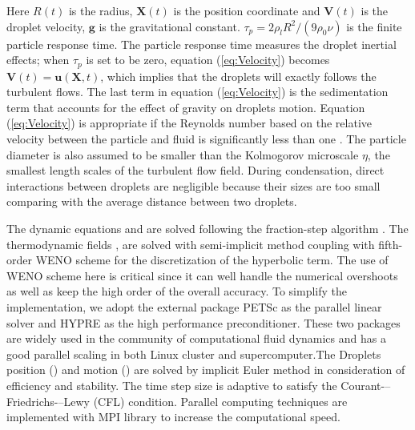 Here $R(t)$ is the radius, $\mathbf{X}(t)$ is the position coordinate and
$\mathbf{V}(t)$ is the droplet velocity, $\mathbf{g}$ is the gravitational
constant. $\tau_{p}=2\rho_{l}R^{2}/(9\rho_{0}\nu)$ is the finite particle
response time. The particle response time measures the droplet inertial
effects; when $\tau_{p}$ is set to be zero, equation (\ref{eq:Velocity})
becomes $\mathbf{V}(t)=\mathbf{u}(\mathbf{X},t)$, which implies that the
droplets will exactly follows the turbulent flows. The last term in equation
(\ref{eq:Velocity}) is the sedimentation term that accounts for the effect of
gravity on droplets motion. Equation (\ref{eq:Velocity}) is appropriate if the
Reynolds number based on the relative velocity between the particle and fluid
is significantly less than one \cite{Eaton1994}. The particle diameter is also
assumed to be smaller than the Kolmogorov microscale $\eta$, the smallest
length scales of the turbulent flow field. During condensation, direct
interactions between droplets are negligible because their sizes are too small
comparing with the average distance between two droplets.

The dynamic equations  and  are solved following the
fraction-step algorithm \cite{Brown2001Accurate}. The thermodynamic fields
,  are solved with semi-implicit method coupling with
fifth-order WENO scheme for the discretization of the hyperbolic term. The use
of WENO scheme here is critical since it can well handle the numerical
overshoots as well as keep the high order of the overall accuracy. To simplify
the implementation, we adopt the external package PETSc \cite{petsc_cite} as
the parallel linear solver and HYPRE \cite{hypre_cite} as the high performance
preconditioner. These two packages are widely used in the community of
computational fluid dynamics and has a good parallel scaling in both Linux
cluster and supercomputer.The Droplets position () and motion
() are solved by implicit Euler method in consideration of
efficiency and stability. The time step size is adaptive to satisfy the
Courant-–Friedrichs-–Lewy (CFL) condition. Parallel computing techniques are
implemented with MPI library to increase the computational speed.

